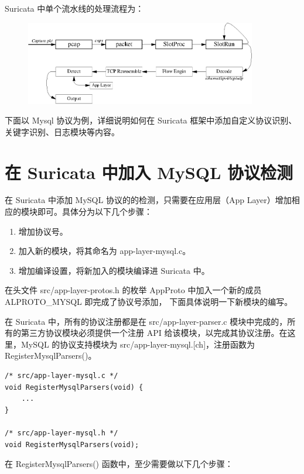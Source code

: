Suricata 中单个流水线的处理流程为：

\begin{figure}[ht!]
    \centering
    \includegraphics[width=0.9\textwidth]{suricata.eps}
\end{figure}

下面以 Mysql 协议为例，详细说明如何在 Suricata 框架中添加自定义协议识别、关键字识别、日志模块等内容。

\section{在 Suricata 中加入 MySQL 协议检测}
在 Suricata 中添加 MySQL 协议的的检测，只需要在应用层（{\ef App Layer}）增加相应的模块即可。具体分为以下几个步骤：

\begin{enumerate}
    \item 增加协议号。
    \item 加入新的模块，将其命名为 {\cf app-layer-mysql.c}。
    \item 增加编译设置，将新加入的模块编译进 Suricata 中。
\end{enumerate}

在头文件 {\ff src/app-layer-protos.h} 的枚举 {\cf AppProto} 中加入一个新的成员 {\cf ALPROTO\_MYSQL} 即完成了协议号添加， 下面具体说明一下新模块的编写。

在 Suricata 中，所有的协议注册都是在 {\ff src/app-layer-parser.c} 模块中完成的，所有的第三方协议模块必须提供一个注册 API 给该模块，以完成其协议注册。在这里，MySQL 的协议支持模块为 {\ff src/app-layer-mysql.[ch]}，注册函数为 {\cf RegisterMysqlParsers()}。

\begin{lstlisting}
/* src/app-layer-mysql.c */
void RegisterMysqlParsers(void) {
    ...
}

/* src/app-layer-mysql.h */
void RegisterMysqlParsers(void);
\end{lstlisting}

在 {\cf RegisterMysqlParsers()} 函数中，至少需要做以下几个步骤：


